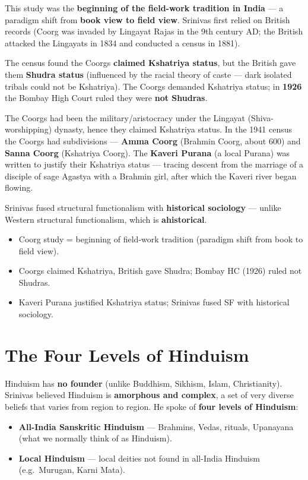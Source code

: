 This study was the \textbf{beginning of the field-work tradition in India} --- a paradigm shift from \textbf{book view to field view}. Srinivas first relied on British records (Coorg was invaded by Lingayat Rajas in the 9th century AD; the British attacked the Lingayats in 1834 and conducted a census in 1881).

\begin{DataFact}
The census found the Coorgs \textbf{claimed Kshatriya status}, but the British gave them \textbf{Shudra status} (influenced by the racial theory of caste --- dark isolated tribals could not be Kshatriya). The Coorgs demanded Kshatriya status; in \textbf{1926} the Bombay High Court ruled they were \textbf{not Shudras}.
\end{DataFact}

The Coorgs had been the military/aristocracy under the Lingayat (Shiva-worshipping) dynasty, hence they claimed Kshatriya status. In the 1941 census the Coorgs had subdivisions --- \textbf{Amma Coorg} (Brahmin Coorg, about 600) and \textbf{Sanna Coorg} (Kshatriya Coorg). The \textbf{Kaveri Purana} (a local Purana) was written to justify their Kshatriya status --- tracing descent from the marriage of a disciple of sage Agastya with a Brahmin girl, after which the Kaveri river began flowing.

\begin{KeyConcept}
Srinivas fused structural functionalism with \textbf{historical sociology} --- unlike Western structural functionalism, which is \textbf{ahistorical}.
\end{KeyConcept}

\begin{QuickRevision}
\begin{itemize}
\item Coorg study = beginning of field-work tradition (paradigm shift from book to field view).
\item Coorgs claimed Kshatriya, British gave Shudra; Bombay HC (1926) ruled not Shudras.
\item Kaveri Purana justified Kshatriya status; Srinivas fused SF with historical sociology.
\end{itemize}
\end{QuickRevision}

\section{The Four Levels of Hinduism}

Hinduism has \textbf{no founder} (unlike Buddhism, Sikhism, Islam, Christianity). Srinivas believed Hinduism is \textbf{amorphous and complex}, a set of very diverse beliefs that varies from region to region. He spoke of \textbf{four levels of Hinduism}:
\begin{itemize}
\item \textbf{All-India Sanskritic Hinduism} --- Brahmins, Vedas, rituals, Upanayana (what we normally think of as Hinduism).
\item \textbf{Local Hinduism} --- local deities not found in all-India Hinduism (e.g.\ Murugan, Karni Mata).
\end{itemize}

